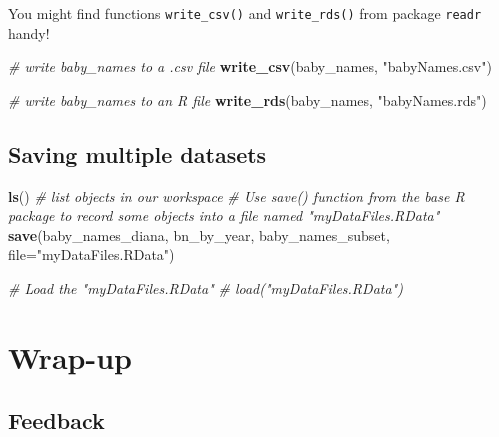 \documentclass[
]{book}
\newenvironment{Shaded}{\begin{snugshade}}{\end{snugshade}}
\newcommand{\CommentTok}[1]{\textcolor[rgb]{0.56,0.35,0.01}{\textit{#1}}}
\newcommand{\DataTypeTok}[1]{\textcolor[rgb]{0.13,0.29,0.53}{#1}}
\newcommand{\KeywordTok}[1]{\textcolor[rgb]{0.13,0.29,0.53}{\textbf{#1}}}
\newcommand{\NormalTok}[1]{#1}
\newcommand{\StringTok}[1]{\textcolor[rgb]{0.31,0.60,0.02}{#1}}
\begin{document}
You might find functions \texttt{write\_csv()} and \texttt{write\_rds()} from package \texttt{readr} handy!

\begin{Shaded}
\begin{Highlighting}[]
\CommentTok{\# write baby\_names to a .csv file}
\KeywordTok{write\_csv}\NormalTok{(baby\_names, }\StringTok{"babyNames.csv"}\NormalTok{)}
\end{Highlighting}
\end{Shaded}

\begin{Shaded}
\begin{Highlighting}[]
\CommentTok{\# write baby\_names to an R file}
\KeywordTok{write\_rds}\NormalTok{(baby\_names, }\StringTok{"babyNames.rds"}\NormalTok{)}
\end{Highlighting}
\end{Shaded}

\hypertarget{saving-multiple-datasets}{%
\subsection{Saving multiple datasets}\label{saving-multiple-datasets}}

\begin{Shaded}
\begin{Highlighting}[]
\KeywordTok{ls}\NormalTok{() }\CommentTok{\# list objects in our workspace}
\CommentTok{\# Use save() function from the base R package to record some objects into a file named "myDataFiles.RData"}
\KeywordTok{save}\NormalTok{(baby\_names\_diana, bn\_by\_year, baby\_names\_subset, }\DataTypeTok{file=}\StringTok{"myDataFiles.RData"}\NormalTok{)  }
\end{Highlighting}
\end{Shaded}

\begin{Shaded}
\begin{Highlighting}[]
\CommentTok{\# Load the "myDataFiles.RData"}
\CommentTok{\# load("myDataFiles.RData") }
\end{Highlighting}
\end{Shaded}

\hypertarget{wrap-up-1}{%
\section{Wrap-up}\label{wrap-up-1}}

\hypertarget{feedback-1}{%
\subsection{Feedback}\label{feedback-1}}
\end{document}
